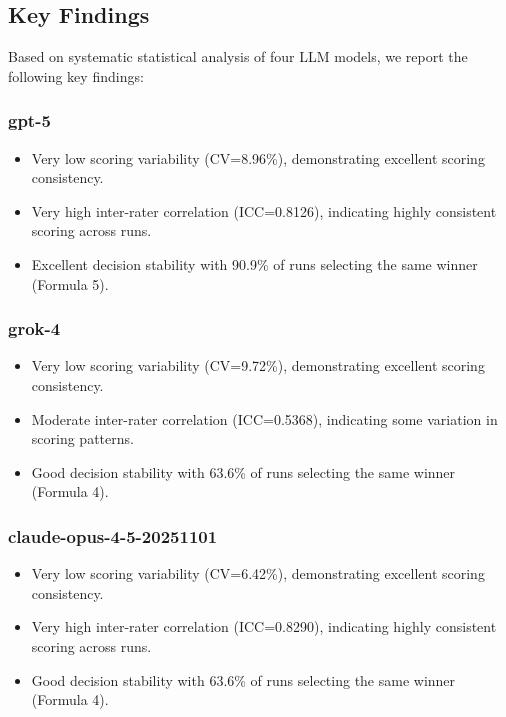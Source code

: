 \documentclass[12pt,a4paper]{article}
\begin{document}
\subsection{Key Findings}

Based on systematic statistical analysis of four LLM models, we report the following key findings:

\subsubsection{gpt-5}

\begin{itemize}
    \item Very low scoring variability (CV=8.96\%), demonstrating excellent scoring consistency.
\end{itemize}
\begin{itemize}
    \item Very high inter-rater correlation (ICC=0.8126), indicating highly consistent scoring across runs.
\end{itemize}
\begin{itemize}
    \item Excellent decision stability with 90.9\% of runs selecting the same winner (Formula 5).
\end{itemize}
\subsubsection{grok-4}

\begin{itemize}
    \item Very low scoring variability (CV=9.72\%), demonstrating excellent scoring consistency.
\end{itemize}
\begin{itemize}
    \item Moderate inter-rater correlation (ICC=0.5368), indicating some variation in scoring patterns.
\end{itemize}
\begin{itemize}
    \item Good decision stability with 63.6\% of runs selecting the same winner (Formula 4).
\end{itemize}
\subsubsection{claude-opus-4-5-20251101}

\begin{itemize}
    \item Very low scoring variability (CV=6.42\%), demonstrating excellent scoring consistency.
\end{itemize}
\begin{itemize}
    \item Very high inter-rater correlation (ICC=0.8290), indicating highly consistent scoring across runs.
\end{itemize}
\begin{itemize}
    \item Good decision stability with 63.6\% of runs selecting the same winner (Formula 4).
\end{itemize}
\end{document}
